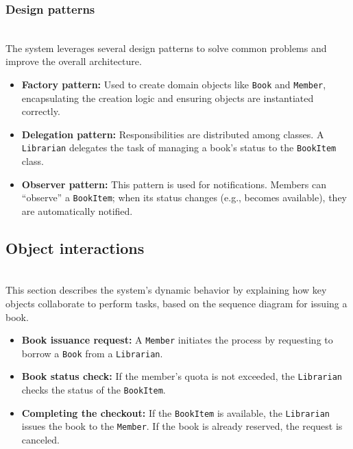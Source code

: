 \subsubsection{Design patterns}\label{Bh0NVN1NdtnnrwFLN48kY}
\\
The system leverages several design patterns to solve common problems and improve the overall architecture.

\begin{itemize}
\item
\protect{}\label{CTWxXfBhRi4WxfxT-gSmB}
\textbf{Factory pattern:} Used to create domain objects like \texttt{Book} and \texttt{Member}, encapsulating the creation logic and ensuring objects are instantiated correctly.
\item
\protect{}\label{0vq0eUzY1YjYw8szK-Tvc}
\textbf{Delegation pattern:} Responsibilities are distributed among classes. A \texttt{Librarian} delegates the task of managing a book's status to the \texttt{BookItem} class.
\item
\protect{}\label{jRJmrpDZKI3-4_W5y_aoh}
\textbf{Observer pattern:} This pattern is used for notifications. Members can ``observe'' a \texttt{BookItem}; when its status changes (e.g., becomes available), they are automatically notified.
\end{itemize}

\subsection{Object interactions}\label{Kyl76gKTQg4hbVFJZTNSe}
\\
This section describes the system's dynamic behavior by explaining how key objects collaborate to perform tasks, based on the sequence diagram for issuing a book.

\begin{itemize}
\item
\protect{}\label{MsGSDzvFKEvH_UxUZwLTl}
\textbf{Book issuance request:} A \texttt{Member} initiates the process by requesting to borrow a \texttt{Book} from a \texttt{Librarian}.
\item
\protect{}\label{why5JovdadIAni9sBNEQH}
\textbf{Book status check:} If the member's quota is not exceeded, the \texttt{Librarian} checks the status of the \texttt{BookItem}.
\item
\protect{}\label{KuOtjTsGE5QSFr1UkVK-w}
\textbf{Completing the checkout:} If the \texttt{BookItem} is available, the \texttt{Librarian} issues the book to the \texttt{Member}. If the book is already reserved, the request is canceled.
\end{itemize}

